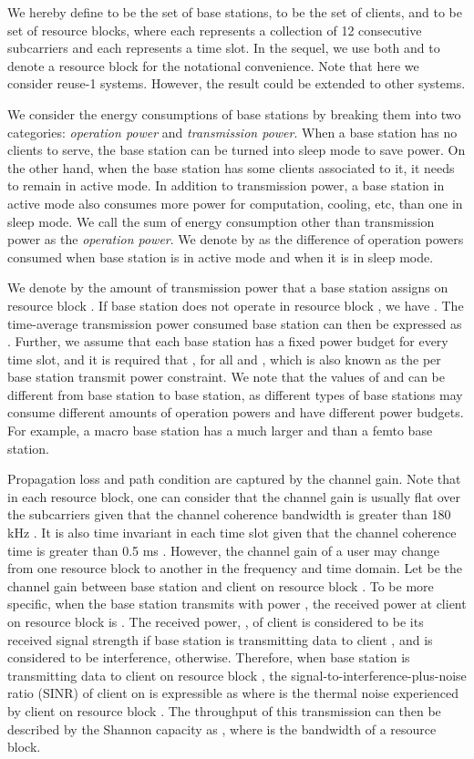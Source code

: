 \documentclass[conference]{IEEEtran}
\begin{document}
We hereby define  to be the set of base stations,  to be the set of clients, and  to be set of resource blocks, where each  represents a collection of 12 consecutive subcarriers and each  represents a time slot. In the sequel, we use both  and  to denote a resource block for the notational convenience. Note that here we consider reuse-1 systems. However, the result could be extended to other systems.

We consider the energy consumptions of base stations by breaking them into two categories: \emph{operation power} and \emph{transmission power}. When a base station has no clients to serve, the base station can be turned into sleep mode to save power. On the other hand, when the base station has some clients associated to it, it needs to remain in active mode. In addition to transmission power, a base station in active mode also consumes more power for computation, cooling, etc, than one in sleep mode. We call the sum of energy consumption other than transmission power as the \emph{operation power}. We denote by  as the difference of operation powers consumed when base station  is in active mode and when it is in sleep mode.

We denote by  the amount of transmission power that a base station  assigns on resource block . If base station  does not operate in resource block , we have . The time-average transmission power consumed base station  can then be expressed as . Further, we assume that each base station  has a fixed power budget  for every time slot, and it is required that , for all  and , which is also known as the per base station transmit power constraint. We note that the values of  and  can be different from base station to base station, as different types of base stations may consume different amounts of operation powers and have different power budgets. For example, a macro base station has a much larger  and  than a femto base station.

Propagation loss and path condition are captured by the channel gain. Note that in each resource block, one can consider that the channel gain is usually flat over the subcarriers given that the channel coherence bandwidth is greater than 180 kHz \cite[Ch.12]{LTEbook2011}. It is also time invariant in each time slot given that the channel coherence time is greater than 0.5 ms \cite[Ch.23]{LTEbook2011}. However, the channel gain of a user may change from one resource block to another in the frequency and time domain. Let  be the channel gain between base station  and client  on resource block . To be more specific, when the base station  transmits with power , the received power at client  on resource block  is . The received power, , of client  is considered to be its received signal strength if base station  is transmitting data to client , and is considered to be interference, otherwise. Therefore, when base station  is transmitting data to client  on resource block , the signal-to-interference-plus-noise ratio (SINR) of client  on  is expressible as 
where  is the thermal noise experienced by client  on resource block . The throughput of this transmission can then be described by the Shannon capacity as , where  is the bandwidth of a resource block.
\end{document}
